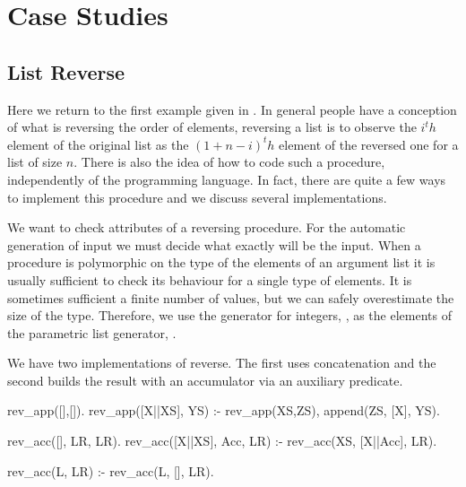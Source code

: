 
\section{Case Studies}
\label{sec:case-studies}




\subsection{List Reverse}

Here we return to the first example given in .
%
In general people have a conception of what is reversing the order of
elements, reversing a list is to observe the $i^th$ element of the original list as
the $(1+n-i)^th$ element of the reversed one for a list of size $n$.
%
There is also the idea of how to code such a procedure, independently of
the programming language.
%
In fact, there are quite a few ways to implement this procedure and we
discuss several implementations.%


We want to check attributes of a reversing procedure.
%
For the automatic generation of input we must decide what
exactly  will be the input.
%
When a procedure is polymorphic on the type of the elements of an
argument list it is usually sufficient to check its behaviour for a
single type of elements.
%
It is sometimes sufficient a finite number of values, but we can
safely overestimate the size of the type.
%
%
Therefore, we use the generator for integers, , as the elements
of the parametric list generator, .


We have two implementations of reverse.
The first uses concatenation and the second
builds the result with an accumulator via an auxiliary predicate.
%
\begin{yapcode}
 rev_app([],[]).
 rev_app([X||XS], YS) :-
   rev_app(XS,ZS), append(ZS, [X], YS).

 rev_acc([], LR, LR).
 rev_acc([X||XS], Acc, LR) :-
   rev_acc(XS, [X||Acc], LR).

 rev_acc(L, LR) :-
   rev_acc(L, [], LR).
\end{yapcode}


